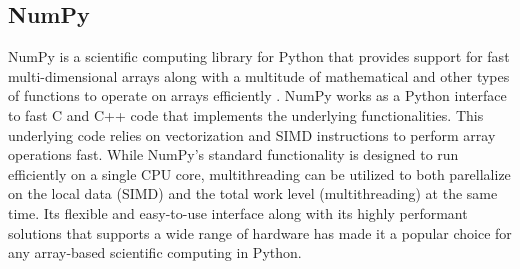 \subsection{NumPy} \label{background:numpy}
NumPy is a scientific computing library for Python that provides support for fast multi-dimensional arrays along with a multitude of mathematical and other types of functions to operate on arrays efficiently \cite{numpy}.
NumPy works as a Python interface to fast C and C++ code that implements the underlying functionalities.
This underlying code relies on vectorization and SIMD instructions to perform array operations fast. 
While NumPy's standard functionality is designed to run efficiently on a single CPU core, multithreading can be utilized to both parellalize on the local data (SIMD) and the total work level (multithreading) at the same time.
Its flexible and easy-to-use interface along with its highly performant solutions that supports a wide range of hardware has made it a popular choice for any array-based scientific computing in Python.

